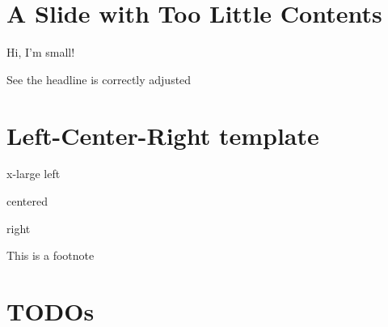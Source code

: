 \section{A Slide with Too Little Contents}
\label{sec-13}

\begin{center}
\begin{smaller}
Hi, I'm small!
\end{smaller}
\end{center}

\begin{note}
See the headline is correctly adjusted
\end{note}

\section{Left-Center-Right template}
\label{sec-14}

\begin{xlarge}
x-large left
\begin{center}
centered
\end{center}
\begin{alignright}
right
\end{alignright}
\end{xlarge}

\begin{note}
This is a footnote
\end{note}

\section{TODOs}
\label{sec-15}


